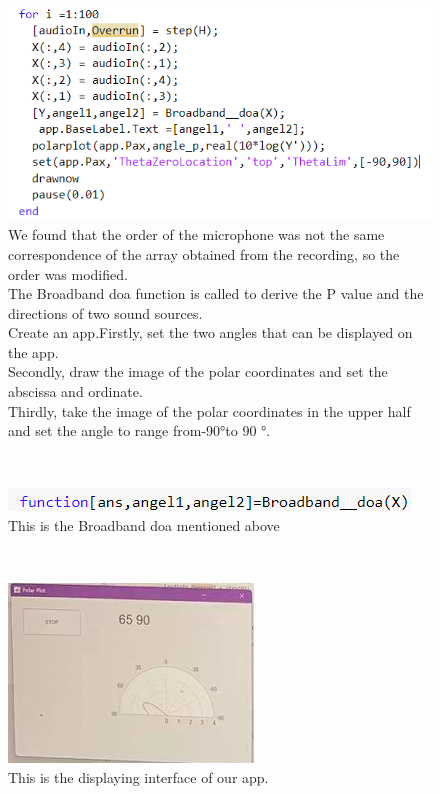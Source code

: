 \documentclass{report}
\begin{document}
\begin{figure}
\includegraphics[scale=1]{录音}
\\We found that the order of the microphone was not the same correspondence of the array obtained from the recording, so the order was modified.
\\The Broadband doa function is called to derive the P value and  the directions of two sound sources.
\\Create an app.Firstly, set the two angles that can be displayed on the app.
\\Secondly, draw the image of the polar coordinates and set the abscissa and ordinate.
\\Thirdly, take the image of the polar coordinates in the upper half and set the angle to range from-90°to 90 °.

\end{figure}
~\\
\begin{figure}
\includegraphics[scale=1]{broadband doa}
\\This is the Broadband doa mentioned above
\end{figure}
~\\
\begin{figure}
\includegraphics[scale=1]{app}
\\This is the displaying interface of our app.
\end{figure}
\end{document}
